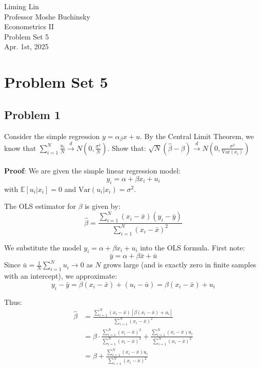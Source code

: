 \documentclass{article}
\begin{document}
\begin{flushleft}
    

Liming Lin\\
Professor Moshe Buchinsky\\
Econometrics II\\
Problem Set 5\\
Apr. 1st, 2025\\
\section*{Problem Set 5}
\subsection*{Problem 1}
Consider the simple regression $y=\alpha_\beta x+u$. By the Central Limit Theorem, we know that $\sum_{i=1}^N \frac{u_i}{N} \overset{d}{\longrightarrow} N(0,\frac{\sigma^2}{N})$. Show that: $
\sqrt{N}(\hat{\beta} - \beta) \overset{d}{\longrightarrow} N\left(0, \frac{\sigma^2}{\text{Var}(x_i)}\right)
$ \\~\\

\textbf{Proof}: We are given the simple linear regression model:
\[
y_i = \alpha + \beta x_i + u_i
\]
with $\mathbb{E}[u_i|x_i] = 0$ and $\text{Var}(u_i|x_i) = \sigma^2$.

The OLS estimator for $\beta$ is given by:
\[
\hat{\beta} = \frac{\sum_{i=1}^N (x_i - \bar{x})(y_i - \bar{y})}{\sum_{i=1}^N (x_i - \bar{x})^2}
\]

We substitute the model $y_i = \alpha + \beta x_i + u_i$ into the OLS formula. First note:
\[
\bar{y} = \alpha + \beta \bar{x} + \bar{u}
\]
Since $\bar{u} = \frac{1}{N}\sum_{i=1}^N u_i \to 0$ as $N$ grows large (and is exactly zero in finite samples with an intercept), we approximate:
\[
y_i - \bar{y} = \beta(x_i - \bar{x}) + (u_i - \bar{u}) = \beta(x_i - \bar{x}) + u_i
\]

Thus:
\begin{align*}
\hat{\beta}
&= \frac{\sum_{i=1}^N (x_i - \bar{x})\left[ \beta(x_i - \bar{x}) + u_i \right]}{\sum_{i=1}^N (x_i - \bar{x})^2} \\
&= \beta \cdot \frac{\sum_{i=1}^N (x_i - \bar{x})^2}{\sum_{i=1}^N (x_i - \bar{x})^2}
+ \frac{\sum_{i=1}^N (x_i - \bar{x}) u_i}{\sum_{i=1}^N (x_i - \bar{x})^2} \\
&= \beta + \frac{\sum_{i=1}^N (x_i - \bar{x}) u_i}{\sum_{i=1}^N (x_i - \bar{x})^2}
\end{align*}


\end{flushleft}
\end{document}
